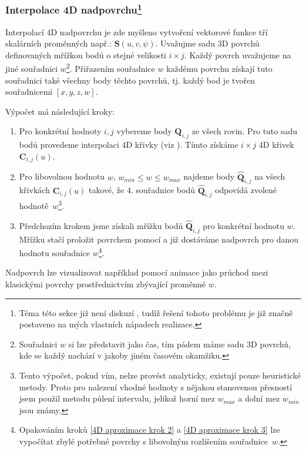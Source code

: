 \subsubsection[Interpolace 4D nadpovrchu]{Interpolace 4D nadpovrchu\footnote{Téma této sekce již není diskuzí \cite{The_NURBS_Book}, tudíž řešení tohoto problému je již značně postaveno na mých vlastních nápadech realizace.}}\label{section:interpolace 4D povrchu}
Interpolací 4D nadpovrchu je zde myšleno vytvoření vektorové funkce tří skalárních proměnných např.: $\bm{S}(u,v,\psi)$. Uvažujme sadu 3D povrchů definovaných mřížkou bodů o stejné velikosti $i \times j$. Každý povrch uvažujeme na jiné souřadnici $w$\footnote{Souřadnici $w$ si lze představit jako čas, tím pádem máme sadu 3D povrchů, kde se každý nachází v jakoby jiném časovém okamžiku.}. Přiřazením souřadnice $w$ každému povrchu získají tuto souřadnici také všechny body těchto povrchů, tj. každý bod je tvořen souřadnicemi $[x,y,z,w]$. \par
Výpočet má následující kroky:
\begin{enumerate}
    \item Pro konkrétní hodnoty $i, j$ vybereme body $\bm{Q}_{i,j}$ ze všech rovin.
          Pro tuto sadu bodů provedeme interpolaci 4D křivky (viz ).
          Tímto získáme $i\times j$ 4D křivek $\bm{C}_{i,j}(u)$.
    \item \label{4D aproximace krok 2} Pro libovolnou hodnotu $w$, $w_{min} \le w \le w_{max}$ najdeme body $\hat{\bm{Q}}_{i,j}$ na všech křivkách $\bm{C}_{i,j}(u)$ takové, že 4. souřadnice bodů $\hat{\bm{Q}}_{i,j}$ odpovídá zvolené hodnotě~$w$\footnote{Tento výpočet, pokud vím, nelze provést analyticky, existují pouze heuristické metody. Proto pro nalezení vhodné hodnoty s nějakou stanovenou přesností jsem použil metodu půlení intervalu, jelikož horní mez $w_{max}$ a dolní mez $w_{min}$ jsou známy.}.
    \item \label{4D aproximace krok 3} Předchozím krokem jsme získali mřížku bodů $\hat{\bm{Q}}_{i,j}$ pro konkrétní hodnotu $w$.
          Mřížku stačí proložit povrchem pomocí  a již dostáváme nadpovrch pro danou hodnotu souřadnice $w$\footnote{Opakováním kroků \ref{4D aproximace krok 2} a \ref{4D aproximace krok 3} lze vypočítat zbylé potřebné povrchy s libovolným rozlišením souřadnice~$w$.}.
\end{enumerate}
Nadpovrch lze vizualizovat například pomocí animace jako průchod mezi klasickými povrchy prostřednictvím zbývající proměnné $w$.
